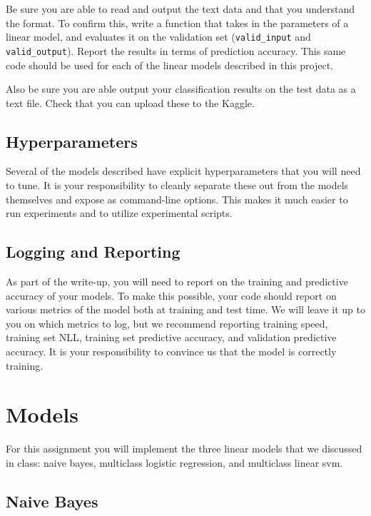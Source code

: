 \documentclass[11pt]{article}
\begin{document}
Be sure you are able to read and output the text data 
and that you understand the format. To confirm this, write a function 
that takes in the parameters of a linear model, and evaluates it on 
the validation set (\texttt{valid\_input} and \texttt{valid\_output}).
Report the results in terms of prediction accuracy. This same code should 
be used for each of the linear models described in this project. 

Also be sure you are able output your classification results on the test data as 
a text file. Check that you can upload these to the Kaggle.

\subsection{Hyperparameters}

Several of the models described have explicit hyperparameters that you will 
need to tune. It is your responsibility to cleanly separate these out from 
the models themselves and expose as command-line options. This makes it much 
easier to run experiments and to utilize experimental scripts. 

\subsection{Logging and Reporting}

As part of the write-up, you will need to report on the training and
predictive accuracy of your models. To make this possible, your code
should report on various metrics of the model both at training and
test time. We will leave it up to you on which metrics to log, but we
recommend reporting training speed, training set NLL, training set
predictive accuracy, and validation predictive accuracy. It is your
responsibility to convince us that the model is correctly training.

\section{Models}

For this assignment you will implement the three linear models that 
we discussed in class: naive bayes, multiclass logistic regression, 
and multiclass linear svm.

\subsection{Naive Bayes}
\end{document}
